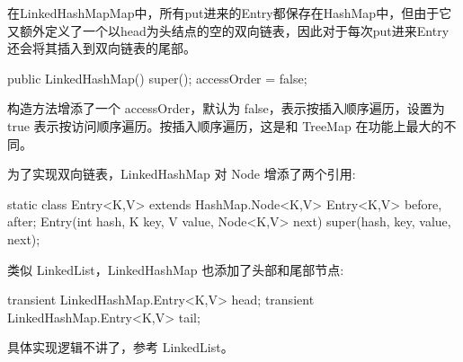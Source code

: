 在LinkedHashMapMap中，所有put进来的Entry都保存在HashMap中，但由于它又额外定义了一个以head为头结点的空的双向链表，因此对于每次put进来Entry还会将其插入到双向链表的尾部。

\begin{Java}
public LinkedHashMap() {
    super();
    accessOrder = false;
}
\end{Java}

构造方法增添了一个 accessOrder，默认为 false，表示按插入顺序遍历，设置为 true 表示按访问顺序遍历。按插入顺序遍历，这是和 TreeMap 在功能上最大的不同。

为了实现双向链表，LinkedHashMap 对 Node 增添了两个引用:

\begin{Java}
static class Entry<K,V> extends HashMap.Node<K,V> {
    Entry<K,V> before, after;
    Entry(int hash, K key, V value, Node<K,V> next) {
        super(hash, key, value, next);
    }
}
\end{Java}

类似 LinkedList，LinkedHashMap 也添加了头部和尾部节点:

\begin{Java}
transient LinkedHashMap.Entry<K,V> head;
transient LinkedHashMap.Entry<K,V> tail;
\end{Java}

具体实现逻辑不讲了，参考 LinkedList。

\newpage
